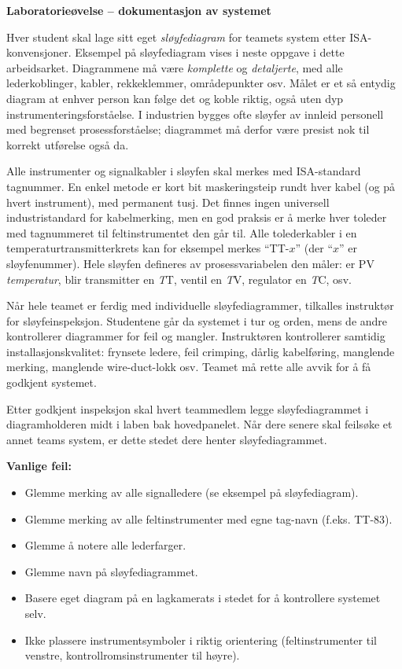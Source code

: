 \noindent
{\bf Laboratorieøvelse -- dokumentasjon av systemet}

\vskip 5pt

Hver student skal lage sitt eget {\it sløyfediagram} for teamets system etter ISA-konvensjoner. Eksempel på sløyfediagram vises i neste oppgave i dette arbeidsarket. Diagrammene må være {\it komplette} og {\it detaljerte}, med alle lederkoblinger, kabler, rekkeklemmer, områdepunkter osv. Målet er et så entydig diagram at enhver person kan følge det og koble riktig, også uten dyp instrumenteringsforståelse. I industrien bygges ofte sløyfer av innleid personell med begrenset prosessforståelse; diagrammet må derfor være presist nok til korrekt utførelse også da.

Alle instrumenter og signalkabler i sløyfen skal merkes med ISA-standard tagnummer. En enkel metode er kort bit maskeringsteip rundt hver kabel (og på hvert instrument), med permanent tusj. Det finnes ingen universell industristandard for kabelmerking, men en god praksis er å merke hver toleder med tagnummeret til feltinstrumentet den går til. Alle tolederkabler i en temperaturtransmitterkrets kan for eksempel merkes ``TT-$x$'' (der ``$x$'' er sløyfenummer). Hele sløyfen defineres av prosessvariabelen den måler: er PV {\it temperatur}, blir transmitter en {\it T}T, ventil en {\it T}V, regulator en {\it T}C, osv.

Når hele teamet er ferdig med individuelle sløyfediagrammer, tilkalles instruktør for sløyfeinspeksjon. Studentene går da systemet i tur og orden, mens de andre kontrollerer diagrammer for feil og mangler. Instruktøren kontrollerer samtidig installasjonskvalitet: frynsete ledere, feil crimping, dårlig kabelføring, manglende merking, manglende wire-duct-lokk osv. Teamet må rette alle avvik for å få godkjent systemet.

Etter godkjent inspeksjon skal hvert teammedlem legge sløyfediagrammet i diagramholderen midt i laben bak hovedpanelet. Når dere senere skal feilsøke et annet teams system, er dette stedet dere henter sløyfediagrammet.

\vskip 10pt

{\bf Vanlige feil:}

\begin{itemize}
\item{} Glemme merking av alle signalledere (se eksempel på sløyfediagram).
\item{} Glemme merking av alle feltinstrumenter med egne tag-navn (f.eks. TT-83).
\item{} Glemme å notere alle lederfarger.
\item{} Glemme navn på sløyfediagrammet.
\item{} Basere eget diagram på en lagkamerats i stedet for å kontrollere systemet selv.
\item{} Ikke plassere instrumentsymboler i riktig orientering (feltinstrumenter til venstre, kontrollromsinstrumenter til høyre).
\end{itemize}

